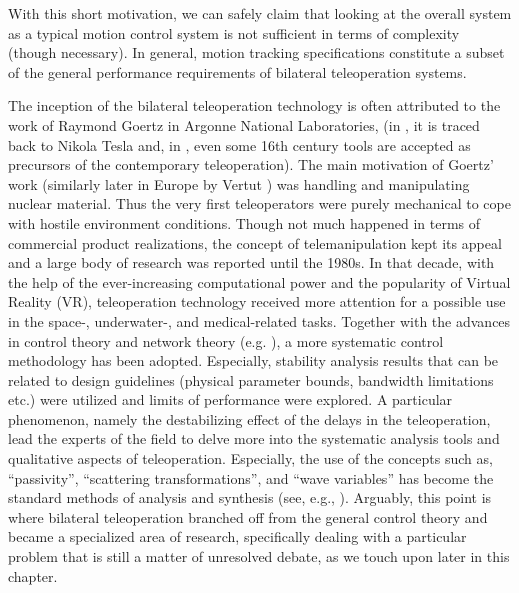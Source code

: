 With this short motivation, we can safely claim that looking at the overall system as a typical motion control 
system is not sufficient in terms of complexity (though necessary). In general, motion tracking specifications 
constitute a subset of the general performance requirements of bilateral teleoperation systems. 



The inception of the bilateral teleoperation technology is often attributed to the work 
of Raymond Goertz in Argonne National Laboratories, \cite{goertz} (in \cite{basanezsuarez}, 
it is traced back to Nikola Tesla and, in \cite{sheridan89}, even some 16th century tools are accepted as precursors 
of the contemporary  teleoperation). The main motivation of Goertz' work (similarly later in Europe 
by Vertut \cite{vertutcoiffet}) was handling and manipulating nuclear material. Thus the very 
first teleoperators were purely mechanical to cope with hostile environment conditions. Though not much 
happened in terms of commercial product realizations, the concept of telemanipulation kept its appeal 
and a large body of research was reported until the 1980s. In that decade, with the help of the 
ever-increasing computational power and the popularity of Virtual Reality (VR), teleoperation 
technology received more attention for a possible use in the space-, underwater-, and medical-related 
tasks. Together with the advances in control theory and network theory (e.g. \cite{miyazaki,furuta}), 
a more systematic control methodology has been adopted. Especially, stability analysis results that can be 
related to design guidelines (physical parameter bounds, bandwidth limitations etc.) were utilized
and limits of performance were explored. A particular phenomenon, namely the destabilizing effect 
of the delays in the teleoperation, lead the experts of the field to delve more into the systematic 
analysis tools and qualitative aspects of teleoperation. Especially, the use of the concepts such as, 
\enquote{passivity}, \enquote{scattering transformations}, and \enquote{wave variables} has become the 
standard methods of analysis and synthesis (see, e.g., \cite{hannaford89,andersonspong,nieslotine}). 
Arguably, this point is where bilateral teleoperation branched off from the general control theory
and became a specialized area of research, specifically dealing with a particular problem that is still
a matter of unresolved debate, as we touch upon later in this chapter.

